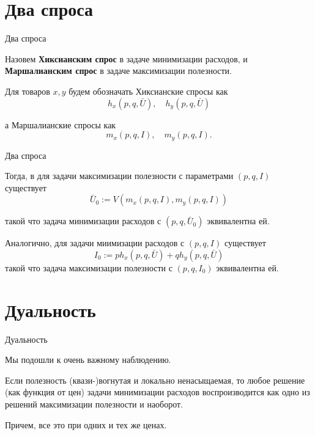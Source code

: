 \documentclass{beamer}
\begin{document}
\section{Два спроса}

\begin{frame}{Два спроса}

\begin{definition}
Назовем \textbf{Хиксианским спрос} в задаче минимизации расходов, и \textbf{Маршалианским спрос} в задаче максимизации полезности. 
\end{definition}

Для товаров $x,y$ будем обозначать Хиксианские спросы как 
$$h_x(p,q,\bar U), \quad h_y(p,q,\bar U)$$

а Маршалианские спросы как
$$m_x(p,q,I), \quad m_y(p,q,I).$$

\end{frame}

\begin{frame}{Два спроса}

Тогда, в для задачи максимизации полезности с параметрами $(p,q,I)$ существует 
$$ \bar U_0 := V(m_x(p,q,I), m_y(p,q,I))$$

такой что задача минимизации расходов с $(p, q, \bar U_0)$ эквивалентна ей. 

Аналогично, для задачи миимизации расходов с $(p, q, I)$ существует
$$ I_0 := p h_x(p,q, \bar U) + q h_y(p,q, \bar U)$$
такой что задача максимизации полезности с $(p, q, I_0)$ эквивалентна ей. 

\end{frame}

\section{Дуальность}

\begin{frame}{Дуальность}

Мы подошли к очень важному наблюдению.

\begin{theorem}[Дуальность]

Если полезность (квази-)вогнутая и локально ненасыщаемая, то любое решение (как функция от цен) задачи минимизации расходов воспроизводится как одно из решений максимизации полезности и наоборот.
\end{theorem}
Причем, все это при одних и тех же ценах.

\end{frame}
\end{document}
